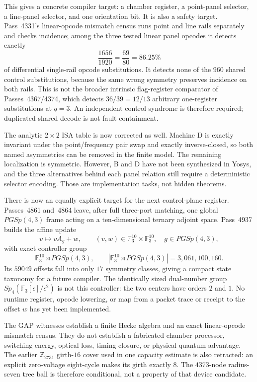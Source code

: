 \documentclass[11pt]{article}
\begin{document}
This gives a concrete compiler target: a chamber register, a point-panel selector, a
line-panel selector, and one orientation bit. It is also a safety target. Pass~4331's
linear-opcode mismatch census runs point and line rails separately and checks incidence;
among the three tested linear panel opcodes it detects exactly
\[
\frac{1656}{1920}=\frac{69}{80}=86.25\%
\]
of differential single-rail opcode substitutions. It detects none of the $960$ shared
control substitutions, because the same wrong symmetry preserves incidence on both rails.
This is not the broader intrinsic flag-register comparator of Passes~4367/4374, which
detects $36/39=12/13$ arbitrary one-register substitutions at $q=3$. An independent
control syndrome is therefore required; duplicated shared decode is not fault containment.

The analytic $2\times2$ ISA table is now corrected as well. Machine D is exactly invariant
under the point/frequency pair swap and exactly inverse-closed, so both named asymmetries can
be removed in the finite model. The remaining localization is symmetric. However, B and D
have not been synthesized in Yosys, and the three alternatives behind each panel relation
still require a deterministic selector encoding. Those are implementation tasks, not hidden
theorems.

There is now an equally explicit target for the next control-plane register.
Passes~4861 and~4864 leave, after full three-port matching, one global
$PGSp(4,3)$ frame acting on a ten-dimensional ternary adjoint space. Pass~4937
builds the affine update
\[
 v\longmapsto vA_g+w,\qquad
 (v,w)\in\mathbb F_3^{10}\times\mathbb F_3^{10},\quad
 g\in PGSp(4,3),
\]
with exact controller group
\[
 \mathbb F_3^{10}\rtimes PGSp(4,3),\qquad
 |\mathbb F_3^{10}\rtimes PGSp(4,3)|=3{,}061{,}100{,}160.
\]
Its $59049$ offsets fall into only $17$ symmetry classes, giving a compact
state taxonomy for a future compiler. The identically sized dual-number group
$Sp_4(\mathbb F_3[\epsilon]/\epsilon^2)$ is not this controller: the two
centers have orders $2$ and $1$. No runtime register, opcode lowering, or map
from a packet trace or receipt to the offset $w$ has yet been implemented.

\begin{honestbox}
The GAP witnesses establish a finite Hecke algebra and an exact linear-opcode mismatch
census. They do not
establish a fabricated chamber processor, switching energy, optical loss, timing closure, or
physical quantum advantage. The earlier $\mathbb Z_{2731}$ girth-$16$ cover used in one
capacity estimate is also retracted: an explicit zero-voltage eight-cycle makes its girth
exactly $8$. The $4373$-node radius-seven tree ball is therefore conditional, not a property
of that device candidate.
\end{honestbox}
\end{document}
